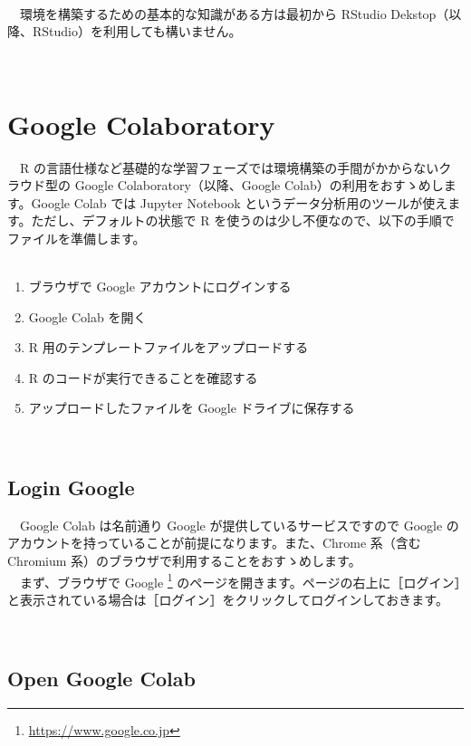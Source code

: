 \documentclass[
  12pt,
]{book}
\DeclareRobustCommand{\href}[2]{#2\footnote{\url{#1}}}
\providecommand{\tightlist}{%
  \setlength{\itemsep}{0pt}\setlength{\parskip}{0pt}}
\begin{document}
　\\
　環境を構築するための基本的な知識がある方は最初から RStudio Dekstop（以降、RStudio）を利用しても構いません。

　

\hypertarget{google-colaboratory}{%
\section{Google Colaboratory}\label{google-colaboratory}}

　R の言語仕様など基礎的な学習フェーズでは環境構築の手間がかからないクラウド型の Google Colaboratory（以降、Google Colab）の利用をおすゝめします。Google Colab では Jupyter Notebook というデータ分析用のツールが使えます。ただし、デフォルトの状態で R を使うのは少し不便なので、以下の手順でファイルを準備します。\\
　

\begin{enumerate}
\def\labelenumi{\arabic{enumi}.}
\tightlist
\item
  ブラウザで Google アカウントにログインする
\item
  Google Colab を開く
\item
  R 用のテンプレートファイルをアップロードする
\item
  R のコードが実行できることを確認する
\item
  アップロードしたファイルを Google ドライブに保存する
\end{enumerate}

　

\hypertarget{login-google}{%
\subsection{Login Google}\label{login-google}}

　Google Colab は名前通り Google が提供しているサービスですので Google のアカウントを持っていることが前提になります。また、Chrome 系（含む Chromium 系）のブラウザで利用することをおすゝめします。\\
　まず、ブラウザで \href{https://www.google.co.jp}{Google } のページを開きます。ページの右上に［ログイン］と表示されている場合は［ログイン］をクリックしてログインしておきます。

　

\hypertarget{open-google-colab}{%
\subsection{Open Google Colab}\label{open-google-colab}}
\end{document}
